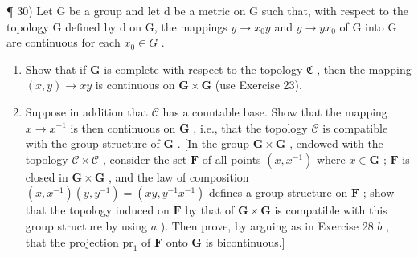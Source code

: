 ¶ 30) Let G be a group and let d be a metric on G such that, with respect to the topology G defined by d on G, the mappings \(y \to x_{0}y\) and \(y \to yx_{0}\) of G into G are continuous for each \(x_{0} \in G\) .

\begin{enumerate}
\def\labelenumi{\alph{enumi})}
\item
  Show that if \(\mathbf{G}\) is complete with respect to the topology \(\mathfrak{C}\) , then the mapping \((x,y)\to xy\) is continuous on \(\mathbf{G}\times\mathbf{G}\) (use Exercise 23).
\item
  Suppose in addition that \(\mathcal{C}\) has a countable base. Show that the mapping \(x \to x^{-1}\) is then continuous on \(\mathbf{G}\) , i.e., that the topology \(\mathcal{C}\) is compatible with the group structure of \(\mathbf{G}\) . {[}In the group \(\mathbf{G} \times \mathbf{G}\) , endowed with the topology \(\mathcal{C} \times \mathcal{C}\) , consider the set \(\mathbf{F}\) of all points \((x, x^{-1})\) where \(x \in \mathbf{G}\) ; \(\mathbf{F}\) is closed in \(\mathbf{G} \times \mathbf{G}\) , and the law of composition \((x, x^{-1})(y, y^{-1}) = (xy, y^{-1}x^{-1})\) defines a group structure on \(\mathbf{F}\) ; show that the topology induced on \(\mathbf{F}\) by that of \(\mathbf{G} \times \mathbf{G}\) is compatible with this group structure by using \(a\) ). Then prove, by arguing as in Exercise 28 \(b\) , that the projection \(\mathrm{pr}_1\) of \(\mathbf{F}\) onto \(\mathbf{G}\) is bicontinuous.{]}
\end{enumerate}

